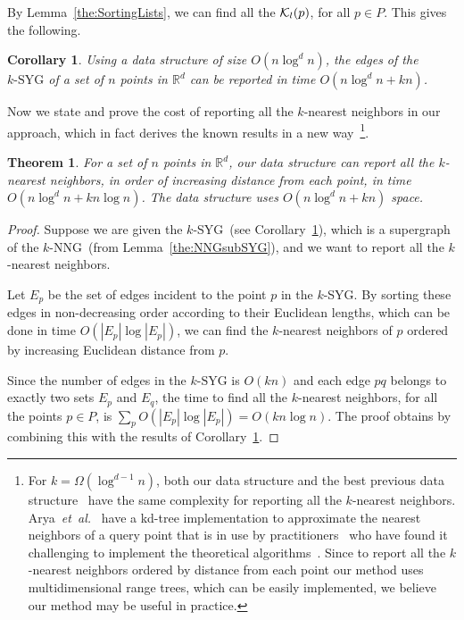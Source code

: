 \documentclass[preprint,12pt]{elsarticle}
\def\knng{\mbox{$k$-NNG}}
\def\ksyg{\mbox{$k$-SYG}}
\newcommand{\etal}{\emph{et~al.}}
\newtheorem{theorem}{Theorem}[section]
\newtheorem{corollary}{Corollary}[section]
\begin{document}
By Lemma~\ref{the:SortingLists}, we can find all the ${\cal K}_l(p)$, for all $p\in P$. This gives the following.


\begin{corollary}\label{the:kSYG_Construction}
Using a data structure of size $O(n\log^d n)$, the edges of the $\ksyg$ of a set of $n$ points in $\mathbb{R}^d$ can be reported in time $O(n\log^d n+kn)$.
\end{corollary}

Now we state and prove the cost of reporting all the $k$-nearest neighbors in our approach, which in fact derives the known results in a new way~\footnote{For $k=\Omega(\log^{d-1}n)$, both our data structure and the best previous data structure~\cite{Dickerson:1996:APP:236464.236474} have the same complexity for reporting all the $k$-nearest neighbors. Arya~\etal~\cite{Arya:1998:OAA:293347.293348} have a kd-tree implementation to approximate the nearest neighbors of a query point that is in use by practitioners~\cite{10.1109/TVCG.2010.9} who have found it challenging to implement the theoretical algorithms~\cite{Vaidya:1989:ONL:70530.70532,Callahan366854,Clarkson:1983:FAN:1382437.1382825,Dickerson:1996:APP:236464.236474}. Since to report all the $k$-nearest neighbors ordered by distance from each point our method uses multidimensional range trees, which can be easily implemented, we believe our method may be useful in practice.}.



\begin{theorem}\label{the:kNNG_Construction}
For a set of $n$ points in $\mathbb{R}^d$, our data structure can report all the $k$-nearest neighbors, in order of increasing distance from each point, in time $O(n\log^d n + kn\log n)$. The data structure uses $O(n\log^d n + kn)$ space.
\end{theorem}
\begin{proof}
Suppose we are given the \ksyg~(see Corollary~\ref{the:kSYG_Construction}), which is a supergraph of the \knng~(from Lemma~\ref{the:NNGsubSYG}), and we want to report all the $k$-nearest neighbors. 

Let $E_p$ be the set of edges incident to the point $p$ in the \ksyg. By sorting these edges in non-decreasing order according to their Euclidean lengths, which can be done in time $O(|E_p|\log |E_p|)$, we can find the $k$-nearest neighbors of $p$  ordered by increasing Euclidean distance from $p$. 

Since the number of edges in the $\ksyg$ is $O(kn)$ and each edge $pq$ belongs to exactly two sets $E_p$ and $E_q$, the time to find all the $k$-nearest neighbors, for all the points $p\in P$, is $\sum_{p} O(|E_p|\log |E_p|) = O(kn\log n)$. The proof obtains by combining this with the results of Corollary~\ref{the:kSYG_Construction}.
\end{proof}
\end{document}
